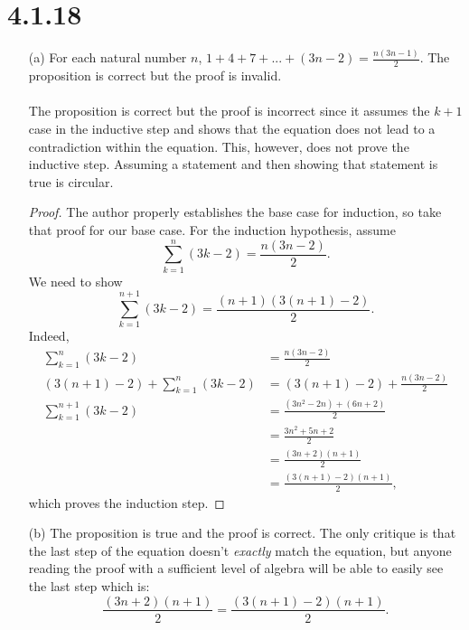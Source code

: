 \documentclass[]{article}
\begin{document}
\section*{4.1.18}
	\begin{itemize}
		\item[(a)] For each natural number $n$, $1 + 4 + 7 + ... + (3n - 2) = \frac{n(3n-1)}{2}.$
		The proposition is correct but the proof is invalid. \\
		\\
			The proposition is correct but the proof is incorrect since it assumes the $k + 1$ case in the inductive step and shows that the equation does not lead to a contradiction within the equation. This, however, does not prove the inductive step. Assuming a statement and then showing that statement is true is circular.
		\begin{proof}
			The author properly establishes the base case for induction, so take that proof for our base case. For the induction hypothesis, assume
			$$
				\sum_{k=1}^n (3k - 2) = \frac{n(3n-2)}{2}.
			$$
			We need to show
			$$
				\sum_{k=1}^{n + 1} (3k - 2) = \frac{(n + 1)(3(n + 1)-2)}{2}.
			$$
			Indeed,
			\begin{align*}
				\sum_{k=1}^n (3k - 2) &= \frac{n(3n-2)}{2} \\
				(3(n + 1) - 2) + \sum_{k=1}^n (3k - 2) &= (3(n + 1) - 2) + \frac{n(3n-2)}{2} \\
				\sum_{k=1}^{n + 1} (3k - 2) &= \frac{(3n^2 - 2n) + (6n + 2)}{2} \\
				&= \frac{3n^2 + 5n + 2}{2} \\
				&= \frac{(3n + 2)(n + 1)}{2} \\
				&= \frac{(3(n + 1) - 2)(n + 1)}{2},
			\end{align*}
			which proves the induction step.
		\end{proof}
		\item[(b)] The proposition is true and the proof is correct. The only critique is that the last step of the equation doesn't \textit{exactly} match the equation, but anyone reading the proof with a sufficient level of algebra will be able to easily see the last step which is:
		$$
			\frac{(3n + 2)(n + 1)}{2} = \frac{(3(n + 1) - 2)(n + 1)}{2}.
		$$
		
	\end{itemize}
\end{document}
